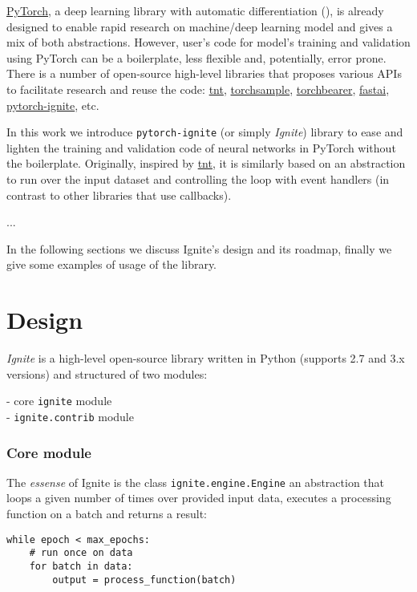 \documentclass{article}
\begin{document}
\href{https://github.com/pytorch/pytorch}{PyTorch}, a deep learning library with automatic differentiation (\cite{paszke2017automatic}), is already designed 
to enable rapid research on machine/deep learning model and gives a mix of both abstractions. However, user's code for model's training and validation 
using PyTorch can be a boilerplate, less flexible and, potentially, error prone. There is a number of 
open-source high-level libraries that proposes various APIs to facilitate research and reuse the code: \href{https://github.com/pytorch/tnt/}{tnt}, \href{https://github.com/ncullen93/torchsample}{torchsample}, 
\href{https://github.com/ecs-vlc/torchbearer}{torchbearer}, \href{https://github.com/fastai/fastai}{fastai}, 
\href{https://github.com/pytorch/ignite}{pytorch-ignite}, etc.

In this work we introduce \texttt{pytorch-ignite} (or simply \emph{Ignite}) library to ease and lighten the training and validation code of neural networks 
in PyTorch without the boilerplate. Originally, inspired by \href{https://github.com/pytorch/tnt/}{tnt}, it is similarly based on an abstraction to run over 
the input dataset and controlling the loop with event handlers (in contrast to other libraries that use callbacks).

...

In the following sections we discuss Ignite's design and its roadmap, finally we give some examples of usage of the library.

\section{Design}

\emph{Ignite} is a high-level open-source library written in Python (supports 2.7 and 3.x versions) and structured of two modules:

- core \texttt{ignite} module \\
- \texttt{ignite.contrib} module

\subsubsection{Core module}

The \emph{essense} of Ignite is the class \texttt{ignite.engine.Engine} an abstraction that loops a given number of times over provided input data, 
executes a processing function on a batch and returns a result:

\begin{verbatim}
while epoch < max_epochs:
    # run once on data
    for batch in data:
        output = process_function(batch)
\end{verbatim}
\end{document}

